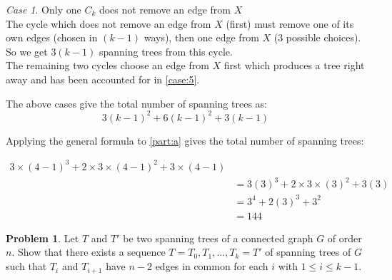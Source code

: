 \documentclass[10pt]{article}
\theoremstyle{plain}
\theoremstyle{definition}
\newtheorem{prob}{Problem}
\theoremstyle{remark}
\newtheorem*{case}{Case}
\begin{document}
\smallskip

\begin{case}{Only one $C_k$ does not remove an edge from $X$} \label{case:6} \\
The cycle which does not remove an edge from $X$ (first) must remove one of its own edges (chosen in $(k-1)$ ways), then one edge from $X$ (3 possible choices). \\
So we get $3(k - 1)$ spanning trees from this cycle. \\
The remaining two cycles choose an edge from $X$ first which produces a tree right away and has been accounted for in \ref{case:5}.
\end{case}

\smallskip

The above cases give the total number of spanning trees as:
\begin{equation} \label{eq:1}
3(k - 1)^2 + 6(k - 1)^2 + 3(k - 1)
\end{equation}

Applying the general formula to \ref{part:a} gives the total number of spanning trees:

\smallskip


\begin{align*}  \label{eq:2}
3 \times (4-1)^3 + 2 \times 3 \times (4-1)^2 + 3 \times (4-1) \\
&= 3(3)^3 + 2 \times 3 \times (3)^2 + 3(3) \\
&= 3^4 + 2(3)^3 + 3^2 \\
&= 144
\end{align*}


\pagebreak


\begin{prob}
Let $T$ and $T'$ be two spanning trees of a connected graph $G$ of order $n$.
Show that there exists a sequence $T = T_0, T_1,\ldots, T_k = T'$ of spanning trees of $G$ such that $T_i$ and $T_{i+1}$ have $n-2$ edges in common for each $i$ with $1\leq i \leq k -1$.
\end{prob}

\medskip
\end{document}
